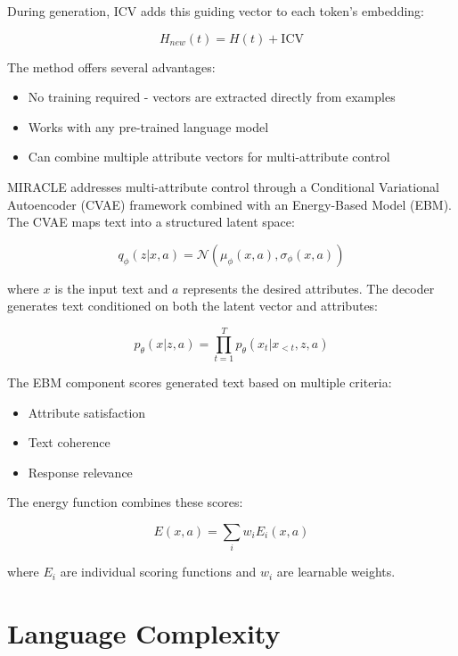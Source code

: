 During generation, ICV adds this guiding vector to each token's embedding:

\begin{equation}
    H_{new}(t) = H(t) + \text{ICV}
\end{equation}

The method offers several advantages:
\begin{itemize}
    \item No training required - vectors are extracted directly from examples
    \item Works with any pre-trained language model
    \item Can combine multiple attribute vectors for multi-attribute control
\end{itemize}

MIRACLE addresses multi-attribute control through a Conditional Variational Autoencoder (CVAE) framework combined with an Energy-Based Model (EBM). The CVAE maps text into a structured latent space:

\begin{equation}
    q_\phi(z|x, a) = \mathcal{N}(\mu_\phi(x, a), \sigma_\phi(x, a))
\end{equation}

where $x$ is the input text and $a$ represents the desired attributes. The decoder generates text conditioned on both the latent vector and attributes:

\begin{equation}
    p_\theta(x|z, a) = \prod_{t=1}^T p_\theta(x_t|x_{<t}, z, a)
\end{equation}

The EBM component scores generated text based on multiple criteria:
\begin{itemize}
    \item Attribute satisfaction
    \item Text coherence
    \item Response relevance
\end{itemize}

The energy function combines these scores:

\begin{equation}
    E(x, a) = \sum_i w_i E_i(x, a)
\end{equation}

where $E_i$ are individual scoring functions and $w_i$ are learnable weights.

\section{Language Complexity}
\label{c2:s:linguistic-complexity}

